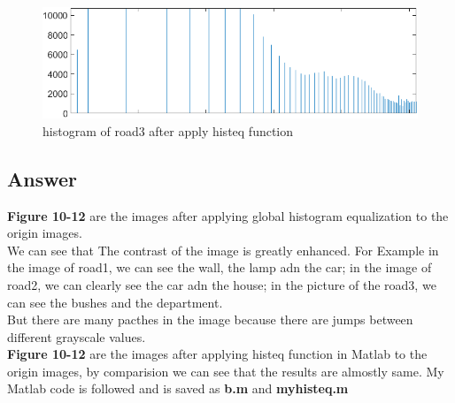 \documentclass[
	12pt, %
]{fphw}
\begin{document}
\begin{figure}[H]
 
	\centering
	\includegraphics[width=1\columnwidth]{T2/result/hist3_global.png} 
	\caption{histogram of road3 after apply histeq function}
	\label{fig21}
\end{figure}
\subsection*{Answer} 
\textbf{Figure 10-12} are the images after applying global histogram equalization to the origin images.\\
We can see that The contrast of the image is greatly enhanced. For Example in the image of road1, we can see the wall, the lamp adn the car; in the image of road2, we can clearly see the car adn the house; in the picture of the road3, we can see the bushes and the department.\\
But there are many pacthes in the image because there are jumps between different grayscale values.\\
\textbf{Figure 10-12} are the images after applying histeq function in Matlab to the origin images, by comparision we can see that the results are almostly same.
My Matlab code is followed and is saved as \textbf{b.m} and \textbf{myhisteq.m}
\end{document}
